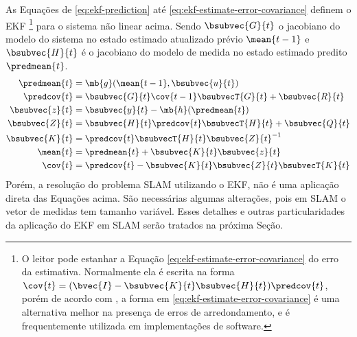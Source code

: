 As Equações de \ref{eq:ekf-prediction} até \ref{eq:ekf-estimate-error-covariance} definem o EKF \footnote{O leitor pode estanhar a Equação \ref{eq:ekf-estimate-error-covariance} do erro da estimativa. Normalmente ela é escrita na forma $\cov{t} = (\bvec{I} - \bsubvec{K}{t} \bsubvec{H}{t}) \predcov{t}$, porém de acordo com , a forma em \ref{eq:ekf-estimate-error-covariance} é uma alternativa melhor na presença de erros de arredondamento, e é frequentemente utilizada em implementações de software.} para o sistema não linear acima. Sendo $\bsubvec{G}{t}$ o jacobiano do modelo do sistema no estado estimado atualizado prévio $\mean{t-1}$ e $\bsubvec{H}{t}$ é o jacobiano do modelo de medida no estado estimado predito $\predmean{t}$.
\begin{align}
  \predmean{t} &= \mb{g}(\mean{t-1}, \bsubvec{u}{t})
  \label{eq:ekf-prediction}\\
  \predcov{t} &= \bsubvec{G}{t}\cov{t-1}\bsubvecT{G}{t} + \bsubvec{R}{t}
  \label{eq:ekf-prediction-error-covariance}\\
  \bsubvec{z}{t} &= \bsubvec{y}{t} - \mb{h}(\predmean{t})
  \label{eq:ekf-inovation} \\
  \bsubvec{Z}{t} &= \bsubvec{H}{t}\predcov{t}\bsubvecT{H}{t} + \bsubvec{Q}{t}
  \label{eq:ekf-inovation-covariance} \\
  \bsubvec{K}{t} &=   \predcov{t}\bsubvecT{H}{t} \bsubvec{Z}{t}^{-1}
  \label{eq:ekf-gain}\\
  \mean{t} &= \predmean{t} + \bsubvec{K}{t} \bsubvec{z}{t}
  \label{eq:ekf-update}\\
  \cov{t} &= \predcov{t} - \bsubvec{K}{t}\bsubvec{Z}{t}\bsubvecT{K}{t}
  \label{eq:ekf-estimate-error-covariance}
\end{align}
Porém, a resolução do problema SLAM utilizando o EKF, não é uma aplicação 
direta das Equações acima. São necessárias algumas alterações, pois em SLAM o vetor de medidas tem tamanho variável. Esses detalhes e outras particularidades da aplicação do EKF em SLAM serão tratados na próxima Seção.

